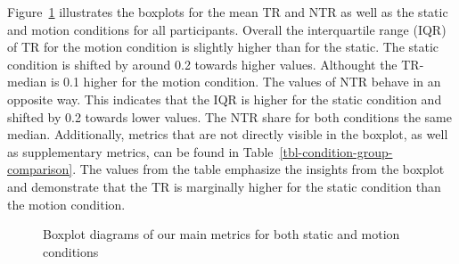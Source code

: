 \documentclass[
  12pt,
  letterpaper,
  DIV=11,
  numbers=noendperiod]{scrreprt}
\begin{document}
Figure~\ref{fig-boxplot-global} illustrates the boxplots for the mean TR
and NTR as well as the static and motion conditions for all
participants. Overall the interquartile range (IQR) of TR for the motion
condition is slightly higher than for the static. The static condition
is shifted by around 0.2 towards higher values. Althought the TR-median
is 0.1 higher for the motion condition. The values of NTR behave in an
opposite way. This indicates that the IQR is higher for the static
condition and shifted by 0.2 towards lower values. The NTR share for
both conditions the same median. Additionally, metrics that are not
directly visible in the boxplot, as well as supplementary metrics, can
be found in Table~\ref{tbl-condition-group-comparison}. The values from
the table emphasize the insights from the boxplot and demonstrate that
the TR is marginally higher for the static condition than the motion
condition.

\begin{figure}


\caption{\label{fig-boxplot-global}Boxplot diagrams of our main metrics
for both static and motion conditions}

\end{figure}%
\end{document}
